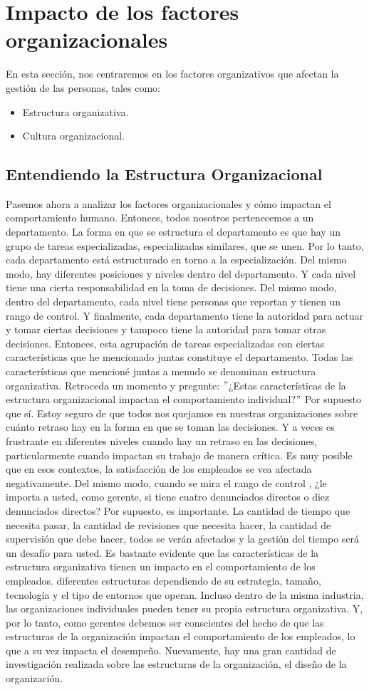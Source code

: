 \documentclass[10pt]{book}
\begin{document}
\section{Impacto de los factores organizacionales}
En esta sección, nos centraremos en los factores organizativos que afectan la gestión de las personas, tales como:
\begin{itemize}
\item Estructura organizativa.
\item Cultura organizacional. 
\end{itemize}
\subsection{Entendiendo la Estructura Organizacional}
Pasemos ahora a analizar los factores organizacionales y cómo impactan el comportamiento humano. Entonces, todos nosotros pertenecemos a un departamento. La forma en que se estructura el departamento es que hay un grupo de tareas especializadas, especializadas similares, que se unen. Por lo tanto, cada departamento está estructurado en torno a la especialización. Del mismo modo, hay diferentes posiciones y niveles dentro del departamento. Y cada nivel tiene una cierta responsabilidad en la toma de decisiones. Del mismo modo, dentro del departamento, cada nivel tiene personas que reportan y tienen un rango de control. Y finalmente, cada departamento tiene la autoridad para actuar y tomar ciertas decisiones y tampoco tiene la autoridad para tomar otras decisiones. Entonces, esta agrupación de tareas especializadas con ciertas características que he mencionado juntas constituye el departamento. Todas las características que mencioné juntas a menudo se denominan estructura organizativa. Retroceda un momento y pregunte: $"$¿Estas características de la estructura organizacional impactan el comportamiento individual?$"$ Por supuesto que sí. Estoy seguro de que todos nos quejamos en nuestras organizaciones sobre cuánto retraso hay en la forma en que se toman las decisiones. Y a veces es frustrante en diferentes niveles cuando hay un retraso en las decisiones, particularmente cuando impactan su trabajo de manera crítica. Es muy posible que en esos contextos, la satisfacción de los empleados se vea afectada negativamente. Del mismo modo, cuando se mira el rango de control , ¿le importa a usted, como gerente, si tiene cuatro denunciados directos o diez denunciados directos? Por supuesto, es importante. La cantidad de tiempo que necesita pasar, la cantidad de revisiones que necesita hacer, la cantidad de supervisión que debe hacer, todos se verán afectados y la gestión del tiempo será un desafío para usted. Es bastante evidente que las características de la estructura organizativa tienen un impacto en el comportamiento de los empleados. diferentes estructuras dependiendo de su estrategia, tamaño, tecnología y el tipo de entornos que operan. Incluso dentro de la misma industria, las organizaciones individuales pueden tener su propia estructura organizativa. Y, por lo tanto, como gerentes debemos ser conscientes del hecho de que las estructuras de la organización impactan el comportamiento de los empleados, lo que a su vez impacta el desempeño. Nuevamente, hay una gran cantidad de investigación realizada sobre las estructuras de la organización, el diseño de la organización.
\end{document}

